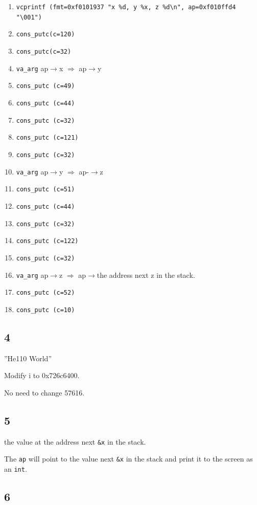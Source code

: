 \documentclass[UTF8,11pt]{ctexart}
\begin{document}
\begin{enumerate}
    \item \verb|vcprintf (fmt=0xf0101937 "x %d, y %x, z %d\n", ap=0xf010ffd4 "\001")|
    \item \verb|cons_putc(c=120)|
    \item \verb|cons_putc(c=32)|
    \item \verb|va_arg| ap$\to$x $\Rightarrow$ ap$\to$y
    \item \verb|cons_putc (c=49)|
    \item \verb|cons_putc (c=44)|
    \item \verb|cons_putc (c=32)|
    \item \verb|cons_putc (c=121)|
    \item \verb|cons_putc (c=32)|
    \item \verb|va_arg| ap$\to$y $\Rightarrow$ ap-$\to$z
    \item \verb|cons_putc (c=51)|
    \item \verb|cons_putc (c=44)|
    \item \verb|cons_putc (c=32)|
    \item \verb|cons_putc (c=122)|
    \item \verb|cons_putc (c=32)|
    \item \verb|va_arg| ap$\to$z $\Rightarrow$ ap$\to$the address next z in the stack.
    \item \verb|cons_putc (c=52)|
    \item \verb|cons_putc (c=10)|
\end{enumerate}
\subsection*{4}
''He110 World''

Modify i to 0x726c6400.

No need to change 57616.
\subsection*{5}

the value at the address next \verb|&x| in the stack.

The \verb|ap| will point to the value next \verb|&x| in the stack and print it to the screen as an \verb|int|.

\subsection*{6}
\end{document}
